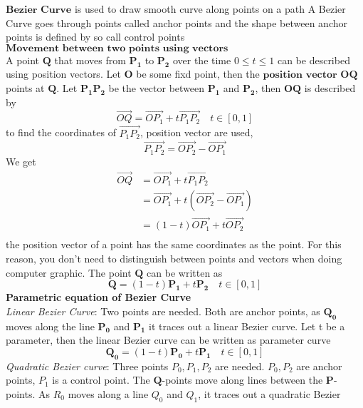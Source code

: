 \documentclass{article}
\begin{document}
    $\textbf{Bezier Curve}$ is used to draw smooth curve along points on a path
    A Bezier Curve goes through points called anchor points and the shape between
    anchor points is defined by so call control points\\

    $\textbf{Movement between two points using vectors}$ \\ 
    A point $\mathbf{Q}$ that moves from $\mathbf{P_1}$ to $\mathbf{P_2}$ over the time $0 \leq t \leq 1$
    can be described using position vectors. Let $\mathbf{O}$ be some fixd point, then the $\textbf{position vector}$
    $\mathbf{OQ}$ points at $\mathbf{Q}$. Let $\mathbf{P_1 P_2}$ be the vector between $\mathbf{P_1}$ and $\mathbf{P_2}$,
    then $\mathbf{OQ}$ is described by 
    \[ 
       \overrightarrow{OQ}  =  \overrightarrow{O P_1} + t\overrightarrow{P_1 P_2} \quad t \in [0, 1]
    \]
    to find the coordinates of $\overrightarrow{P_1 P_2}$, position vector are used,\\
    \[ \overrightarrow{P_1 P_2} = \overrightarrow{O P_2} - \overrightarrow{O P_1} \]
    We get\\
    \begin{align*}
       \overrightarrow{OQ} &= \overrightarrow{O P_1} + t\overrightarrow{P_1 P_2} \\
                           &= \overrightarrow{O P_1} + t (\overrightarrow{O P_2} - \overrightarrow{O P_1}) \\
                           &= (1-t)\overrightarrow{O P_1} + t \overrightarrow{O P_2}\\
    \end{align*}
    the position vector of a point has the same coordinates as the point. For this reason, you don't need to distinguish
    between points and vectors when doing computer graphic. The point $\mathbf{Q}$ can be written as  
    \[ \mathbf{Q} = (1-t) \mathbf{P_1} + t \mathbf{P_2} \quad t \in [0, 1] \]
    \textbf{Parametric equation of Bezier Curve}\\
    \textit{Linear Bezier Curve}: Two points are needed. Both are anchor points, as $\mathbf{Q_0}$ moves along the line $\mathbf{P_0}$ and $\mathbf{P_1}$ 
    it traces out a linear Bezier curve. Let t be a parameter, then the linear Bezier curve can be written as parameter curve
    \[ \mathbf{Q_0} = (1-t) \mathbf{P_0} + t \mathbf{P_1} \quad t \in [0, 1] \]
    \textit{Quadratic Bezier curve}: Three points $P_0, P_1, P_2$ are needed. $P_0, P_2$ are anchor points, $P_1$ is a control point.
    The $\mathbf{Q}$-points move along lines between the $\mathbf{P}$-points. As $R_0$ moves along a line $Q_0$ and $Q_1$, it traces out a quadratic Bezier
\end{document}
